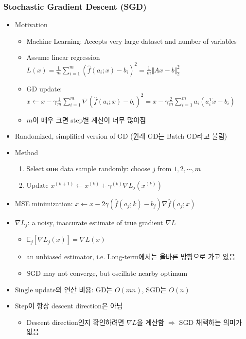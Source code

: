 \subsubsection*{Stochastic Gradient Descent (SGD)}
\begin{itemize}
    \item Motivation
    \begin{itemize}
        \item Machine Learning: Accepts very large dataset and number of variables
        \item Assume linear regression $L(x)=\frac{1}{m}\sum_{i=1}^{m}\left(\hat{f}(a_i;x)-b_i\right)^2 = \frac{1}{m}\Vert Ax-b\Vert_2^2$
        \item GD update: $x\leftarrow x-\gamma\frac{1}{m}\sum_{i=1}^{m}\nabla\left(\hat{f}(a_i;x)-b_i\right)^2=x-\gamma\frac{2}{m}\sum_{i=1}^ma_i(a_i^Tx-b_i)$
        \item $m$이 매우 크면 step별 계산이 너무 많아짐
    \end{itemize}
    \newpage
    \item Randomized, simplified version of GD (원래 GD는 Batch GD라고 불림)
    \item Method
    \begin{enumerate}
        \item Select \textbf{one} data sample randomly: choose $j$ from $1,2,\cdots,m$
        \item Update $x^{(k+1)}\leftarrow x^{(k)}+\gamma^{(k)}\nabla L_j(x^{(k)})$
    \end{enumerate}
    \item MSE minimization: $x\leftarrow x-2\gamma\left(\hat{f}(a_j;k)-b_j\right)\nabla\hat{f}(a_j;x)$
    \item $\nabla L_j$: a noisy, inaccurate estimate of true gradient $\nabla L$
    \begin{itemize}
        \item $\mathbb{E}_j[\nabla L_j(x)]=\nabla L(x)$
        \item an unbiased estimator, i.e. Long-term에서는 올바른 방향으로 가고 있음
        \item SGD may not converge, but oscillate nearby optimum
    \end{itemize}
    \item Single update의 연산 비용: GD는 $O(mn)$, SGD는 $O(n)$
    \item Step이 항상 descent direction은 아님
    \begin{itemize}
        \item Descent direction인지 확인하려면 $\nabla L$을 계산함 $\Rightarrow$ SGD 채택하는 의미가 없음

\end{itemize}
\end{itemize}
